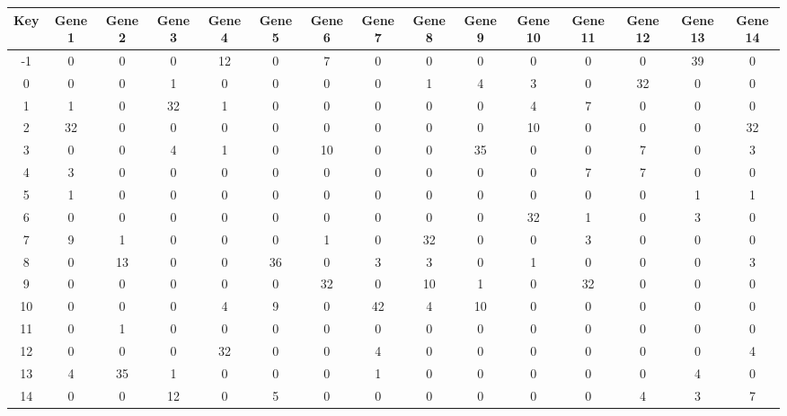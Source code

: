 \begin{tabular}{|c|c|c|c|c|c|c|c|c|c|c|c|c|c|c|}
\hline
Key & Gene 1 & Gene 2 & Gene 3 & Gene 4 & Gene 5 & Gene 6 & Gene 7 & Gene 8 & Gene 9 & Gene 10 & Gene 11 & Gene 12 & Gene 13 & Gene 14 \\
\hline
-1 & 0 & 0 & 0 & 12 & 0 & 7 & 0 & 0 & 0 & 0 & 0 & 0 & 39 & 0 \\
0 & 0 & 0 & 1 & 0 & 0 & 0 & 0 & 1 & 4 & 3 & 0 & 32 & 0 & 0 \\
1 & 1 & 0 & 32 & 1 & 0 & 0 & 0 & 0 & 0 & 4 & 7 & 0 & 0 & 0 \\
2 & 32 & 0 & 0 & 0 & 0 & 0 & 0 & 0 & 0 & 10 & 0 & 0 & 0 & 32 \\
3 & 0 & 0 & 4 & 1 & 0 & 10 & 0 & 0 & 35 & 0 & 0 & 7 & 0 & 3 \\
4 & 3 & 0 & 0 & 0 & 0 & 0 & 0 & 0 & 0 & 0 & 7 & 7 & 0 & 0 \\
5 & 1 & 0 & 0 & 0 & 0 & 0 & 0 & 0 & 0 & 0 & 0 & 0 & 1 & 1 \\
6 & 0 & 0 & 0 & 0 & 0 & 0 & 0 & 0 & 0 & 32 & 1 & 0 & 3 & 0 \\
7 & 9 & 1 & 0 & 0 & 0 & 1 & 0 & 32 & 0 & 0 & 3 & 0 & 0 & 0 \\
8 & 0 & 13 & 0 & 0 & 36 & 0 & 3 & 3 & 0 & 1 & 0 & 0 & 0 & 3 \\
9 & 0 & 0 & 0 & 0 & 0 & 32 & 0 & 10 & 1 & 0 & 32 & 0 & 0 & 0 \\
10 & 0 & 0 & 0 & 4 & 9 & 0 & 42 & 4 & 10 & 0 & 0 & 0 & 0 & 0 \\
11 & 0 & 1 & 0 & 0 & 0 & 0 & 0 & 0 & 0 & 0 & 0 & 0 & 0 & 0 \\
12 & 0 & 0 & 0 & 32 & 0 & 0 & 4 & 0 & 0 & 0 & 0 & 0 & 0 & 4 \\
13 & 4 & 35 & 1 & 0 & 0 & 0 & 1 & 0 & 0 & 0 & 0 & 0 & 4 & 0 \\
14 & 0 & 0 & 12 & 0 & 5 & 0 & 0 & 0 & 0 & 0 & 0 & 4 & 3 & 7 \\
\hline
\end{tabular}